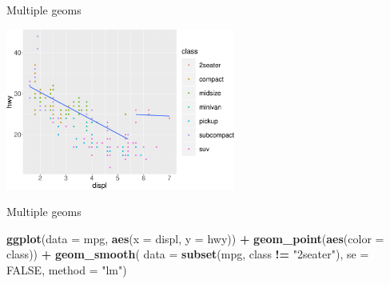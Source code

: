 \documentclass[ignorenonframetext,]{beamer}
\newenvironment{Shaded}{\begin{snugshade}}{\end{snugshade}}
\newcommand{\DataTypeTok}[1]{\textcolor[rgb]{0.13,0.29,0.53}{#1}}
\newcommand{\KeywordTok}[1]{\textcolor[rgb]{0.13,0.29,0.53}{\textbf{#1}}}
\newcommand{\NormalTok}[1]{#1}
\newcommand{\OperatorTok}[1]{\textcolor[rgb]{0.81,0.36,0.00}{\textbf{#1}}}
\newcommand{\OtherTok}[1]{\textcolor[rgb]{0.56,0.35,0.01}{#1}}
\newcommand{\StringTok}[1]{\textcolor[rgb]{0.31,0.60,0.02}{#1}}
\begin{document}
\begin{frame}{Multiple geoms}
\protect\hypertarget{multiple-geoms-30}{}

\begin{center}\includegraphics[height=200px]{data-visualization_files/figure-beamer/unnamed-chunk-107-1} \end{center}

\end{frame}

\begin{frame}[fragile]{Multiple geoms}
\protect\hypertarget{multiple-geoms-31}{}

\begin{Shaded}
\begin{Highlighting}[]
\KeywordTok{ggplot}\NormalTok{(}\DataTypeTok{data =}\NormalTok{ mpg, }\KeywordTok{aes}\NormalTok{(}\DataTypeTok{x =}\NormalTok{ displ, }\DataTypeTok{y =}\NormalTok{ hwy)) }\OperatorTok{+}
\StringTok{       }\KeywordTok{geom_point}\NormalTok{(}\KeywordTok{aes}\NormalTok{(}\DataTypeTok{color =}\NormalTok{ class)) }\OperatorTok{+}
\StringTok{       }\KeywordTok{geom_smooth}\NormalTok{(}
         \DataTypeTok{data =} \KeywordTok{subset}\NormalTok{(mpg, class }\OperatorTok{!=}\StringTok{ "2seater"}\NormalTok{),}
         \DataTypeTok{se =} \OtherTok{FALSE}\NormalTok{,}
         \DataTypeTok{method =} \StringTok{"lm"}\NormalTok{)}
\end{Highlighting}
\end{Shaded}

\end{frame}
\end{document}
